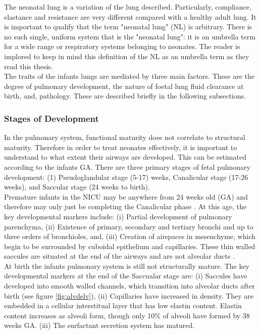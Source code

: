 \documentclass[12pt, openany, oneside]{book}
\begin{document}
The neonatal lung is a variation of the lung described. Particularly, compliance, elastance and resistance are very different compared with a healthy adult lung. It is important to qualify that the term "neonatal lung" (NL) is arbitrary. There is no such single, uniform system that is the "neonatal lung": it is an umbrella term for a wide range or respiratory systems belonging to neonates. The reader is implored to keep in mind this definition of the NL as an umbrella term as they read this thesis. \\

The traits of the infants lungs are mediated by three main factors. These are the degree of pulmonary development, the nature of foetal lung fluid clearance at birth, and, pathology. These are described briefly in the following subsections.

\subsubsection{Stages of Development}
In the pulmonary system, functional maturity does not correlate to structural maturity. Therefore in order to treat neonates effectively, it is important to understand to what extent their airways are developed. This can be estimated according to the infants GA. There are three primary stages of fetal pulmonary development: (1) Pseudoglandular stage (5-17) weeks, Canalicular stage (17-26 weeks), and Saccular stage (24 weeks to birth). \\

Premature infants in the NICU may be anywhere from 24 weeks old (GA) and therefore may only just be completing the Canalicular phase \cite{burri1984fetal}. At this age, the key developmental markers include: (i) Partial development of pulmonary parenchyma, (ii) Existence of primary, secondary and tertiary bronchi and up to three orders of bronchioles, and, (iii) Creation of airspaces in mesenchyme, which begin to be surrounded by cuboidal epithelium and capillaries. These thin walled saccules are situated at the end of the airways and are not alveolar ducts \cite{burri1984fetal}.\\

At birth the infants pulmonary system is still not structurally mature. The key developmental markers at the end of the Saccualar stage are: (i) Saccules have developed into smooth walled channels, which transition into alveolar ducts after birth (see figure \ref{fig:alvdelv}), (ii) Capillaries have increased in density. They are embedded in a cellular interstitual layer that has low elastin content. Elastin content increases as alveoli form, though only 10{\%} of alveoli have formed by 38 weeks GA. (iii) The surfactant secretion system has matured. \\
\end{document}
